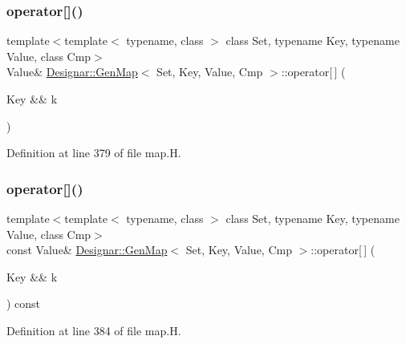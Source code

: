 \subsubsection{\texorpdfstring{operator[]()}{operator[]()}\hspace{0.1cm}{\footnotesize\ttfamily [3/4]}}
{\footnotesize\ttfamily template$<$template$<$ typename, class $>$ class Set, typename Key, typename Value, class Cmp$>$ \\
Value\& \hyperlink{class_designar_1_1_gen_map}{Designar\+::\+Gen\+Map}$<$ Set, Key, Value, Cmp $>$\+::operator\mbox{[}$\,$\mbox{]} (\begin{DoxyParamCaption}\item[{Key \&\&}]{k }\end{DoxyParamCaption})\hspace{0.3cm}{\ttfamily [inline]}}



Definition at line 379 of file map.\+H.

\mbox{\label{class_designar_1_1_gen_map_ac28a9a47f9d373466fe64c6a16105e74}} 
\subsubsection{\texorpdfstring{operator[]()}{operator[]()}\hspace{0.1cm}{\footnotesize\ttfamily [4/4]}}
{\footnotesize\ttfamily template$<$template$<$ typename, class $>$ class Set, typename Key, typename Value, class Cmp$>$ \\
const Value\& \hyperlink{class_designar_1_1_gen_map}{Designar\+::\+Gen\+Map}$<$ Set, Key, Value, Cmp $>$\+::operator\mbox{[}$\,$\mbox{]} (\begin{DoxyParamCaption}\item[{Key \&\&}]{k }\end{DoxyParamCaption}) const\hspace{0.3cm}{\ttfamily [inline]}}



Definition at line 384 of file map.\+H.

\mbox{\label{class_designar_1_1_gen_map_a9d4608ebd3b589a6989d838979a7b2e7}} 
